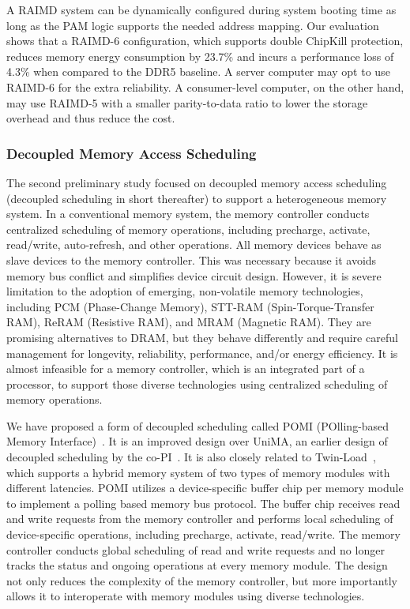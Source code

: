 \documentclass[11pt]{article}
\begin{document}
A RAIMD system can be dynamically configured during system booting time as long
as the PAM logic supports the needed address mapping. Our evaluation shows that
a RAIMD-6 configuration, which supports double ChipKill protection, reduces
memory energy consumption by 23.7\% and incurs a performance loss of 4.3\% when
compared to the DDR5 baseline.  A server computer may opt to use RAIMD-6 for the
extra reliability.  A consumer-level computer, on the other hand, may use
RAIMD-5 with a smaller parity-to-data ratio to lower the storage overhead and
thus reduce the cost.

\subsubsection{Decoupled Memory Access Scheduling}

The second preliminary study focused on decoupled memory access scheduling
(decoupled scheduling in short thereafter) to support a heterogeneous memory
system.  In a conventional memory system, the memory controller conducts
centralized scheduling of memory operations, including precharge, activate,
read/write, auto-refresh, and other operations.  All memory devices behave as
slave devices to the memory controller.  This was necessary because it avoids
memory bus conflict and simplifies device circuit design.  However, it is severe
limitation to the adoption of emerging, non-volatile memory technologies,
including PCM (Phase-Change Memory), STT-RAM (Spin-Torque-Transfer RAM), ReRAM
(Resistive RAM), and MRAM (Magnetic RAM).  They are promising
alternatives to DRAM, but they behave differently and require careful management
for longevity, reliability, performance, and/or energy efficiency.  It is almost
infeasible for a memory controller, which is an integrated part of a processor,
to support those diverse technologies using centralized scheduling of memory
operations.

We have proposed a form of decoupled scheduling called POMI (POlling-based
Memory Interface)~\cite{Trung:pomi}.  It is an improved design over UniMA, an earlier
design of decoupled scheduling by the co-PI~\cite{Fang:pact11}.  It is also closely related
to Twin-Load~\cite{Cui:memsys16}, which supports a hybrid memory system of two types of
memory modules with different latencies.  POMI utilizes a device-specific buffer
chip per memory module to implement a polling based memory bus protocol.  The
buffer chip receives read and write requests from the memory controller and
performs local scheduling of device-specific operations, including precharge,
activate, read/write. The memory controller conducts global scheduling of read
and write requests and no longer tracks the status and ongoing operations at
every memory module.  The design not only reduces the complexity of the memory
controller, but more importantly allows it to interoperate with memory modules
using diverse technologies.
\end{document}
